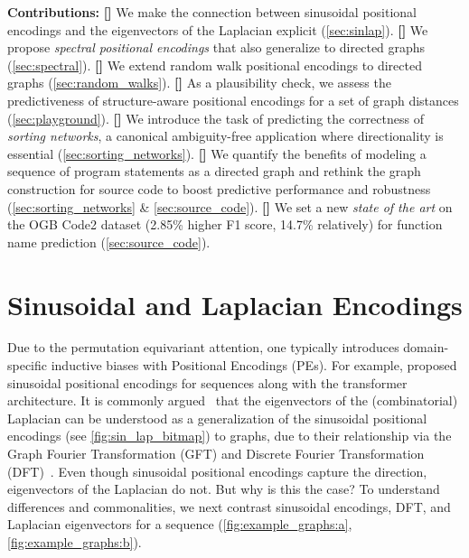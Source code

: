 \documentclass{article}
\newcommand*{\rom}[1]{\uppercase\expandafter{\romannumeral #1\relax}}
\begin{document}
\textbf{Contributions:} 
\textbf{[\rom{1}]} We make the connection between sinusoidal positional encodings and the eigenvectors of the Laplacian explicit (\autoref{sec:sinlap}).\;
\textbf{[\rom{2}]} We propose \emph{spectral positional encodings} that also generalize to directed graphs  (\autoref{sec:spectral}).\;
\textbf{[\rom{3}]} We extend random walk positional encodings to directed graphs (\autoref{sec:random_walks}).\;
\textbf{[\rom{4}]} As a plausibility check, we assess the predictiveness of structure-aware positional encodings for a set of graph distances (\autoref{sec:playground}).\;
\textbf{[\rom{5}]} We introduce the task of predicting the correctness of \emph{sorting networks}, a canonical ambiguity-free application where directionality is essential (\autoref{sec:sorting_networks}).\;
\textbf{[\rom{6}]} We quantify the benefits of modeling a sequence of program statements as a directed graph and rethink the graph construction for source code to boost predictive performance and robustness (\autoref{sec:sorting_networks} \& \ref{sec:source_code}).\;
\textbf{[\rom{7}]} We set a new \emph{state of the art} on the OGB Code2 dataset (2.85\% higher F1 score, 14.7\% relatively) for function name prediction (\autoref{sec:source_code}).

\section{Sinusoidal and Laplacian Encodings}
\label{sec:sinlap}

Due to the permutation equivariant attention, one typically introduces domain-specific inductive biases with Positional Encodings (PEs). For example, \citet{vaswani_attention_2017} proposed sinusoidal positional encodings for sequences along with the transformer architecture. It is commonly argued~\citep{bronstein_geometric_2021, dwivedi_generalization_2021} that the eigenvectors of the (combinatorial) Laplacian can be understood as a generalization of the sinusoidal positional encodings (see \autoref{fig:sin_lap_bitmap}) to graphs, due to their relationship via the Graph Fourier Transformation (GFT) and Discrete Fourier Transformation (DFT)~\citep{smith_scientist_1999}. Even though sinusoidal positional encodings capture the direction, eigenvectors of the Laplacian do not. But why is this the case? To understand differences and commonalities, we next contrast sinusoidal encodings, DFT, and Laplacian eigenvectors for a sequence (\autoref{fig:example_graphs:a},\ref{fig:example_graphs:b}).
\end{document}
